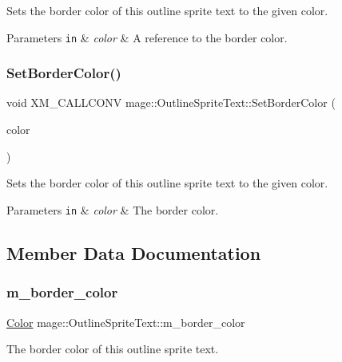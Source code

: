 Sets the border color of this outline sprite text to the given color.


\begin{DoxyParams}[1]{Parameters}
\mbox{\tt in}  & {\em color} & A reference to the border color. \\
\hline
\end{DoxyParams}
\hypertarget{classmage_1_1_outline_sprite_text_a861b01bf303caf0c08a599f3d4a77894}{}\label{classmage_1_1_outline_sprite_text_a861b01bf303caf0c08a599f3d4a77894} 
\subsubsection{\texorpdfstring{Set\+Border\+Color()}{SetBorderColor()}\hspace{0.1cm}{\footnotesize\ttfamily [3/3]}}
{\footnotesize\ttfamily void X\+M\+\_\+\+C\+A\+L\+L\+C\+O\+NV mage\+::\+Outline\+Sprite\+Text\+::\+Set\+Border\+Color (\begin{DoxyParamCaption}\item[{F\+X\+M\+V\+E\+C\+T\+OR}]{color }\end{DoxyParamCaption})\hspace{0.3cm}{\ttfamily [noexcept]}}

Sets the border color of this outline sprite text to the given color.


\begin{DoxyParams}[1]{Parameters}
\mbox{\tt in}  & {\em color} & The border color. \\
\hline
\end{DoxyParams}


\subsection{Member Data Documentation}
\hypertarget{classmage_1_1_outline_sprite_text_a19301d370498a08759445f415da78822}{}\label{classmage_1_1_outline_sprite_text_a19301d370498a08759445f415da78822} 
\subsubsection{\texorpdfstring{m\+\_\+border\+\_\+color}{m\_border\_color}}
{\footnotesize\ttfamily \hyperlink{structmage_1_1_color}{Color} mage\+::\+Outline\+Sprite\+Text\+::m\+\_\+border\+\_\+color\hspace{0.3cm}{\ttfamily [private]}}

The border color of this outline sprite text. 